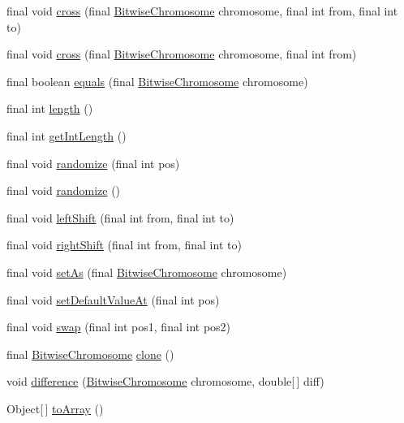 \begin{DoxyCompactItemize}
final void \hyperlink{classjenes_1_1chromosome_1_1_bitwise_chromosome_a2d711baa2a74ccb064d33ef73edbd464}{cross} (final \hyperlink{classjenes_1_1chromosome_1_1_bitwise_chromosome}{Bitwise\-Chromosome} chromosome, final int from, final int to)
\item 
final void \hyperlink{classjenes_1_1chromosome_1_1_bitwise_chromosome_a933b1991999fa3b586c1739744751725}{cross} (final \hyperlink{classjenes_1_1chromosome_1_1_bitwise_chromosome}{Bitwise\-Chromosome} chromosome, final int from)
\item 
final boolean \hyperlink{classjenes_1_1chromosome_1_1_bitwise_chromosome_a41c9858f7ef05194011d1e227fea3584}{equals} (final \hyperlink{classjenes_1_1chromosome_1_1_bitwise_chromosome}{Bitwise\-Chromosome} chromosome)
\item 
final int \hyperlink{classjenes_1_1chromosome_1_1_bitwise_chromosome_a0da8899c89f8b1f222526acf1d2e8519}{length} ()
\item 
final int \hyperlink{classjenes_1_1chromosome_1_1_bitwise_chromosome_a5878e8d0ace81cfb617f75109c02855d}{get\-Int\-Length} ()
\item 
final void \hyperlink{classjenes_1_1chromosome_1_1_bitwise_chromosome_a1a79d4c9c671d2f735d57d64c59dfdb8}{randomize} (final int pos)
\item 
final void \hyperlink{classjenes_1_1chromosome_1_1_bitwise_chromosome_a8028fde93528b7b51313f6c311b2b640}{randomize} ()
\item 
final void \hyperlink{classjenes_1_1chromosome_1_1_bitwise_chromosome_ab02c791be30c931cae793289185e459f}{left\-Shift} (final int from, final int to)
\item 
final void \hyperlink{classjenes_1_1chromosome_1_1_bitwise_chromosome_afb689c4b268f7954214a9d0e13c6141e}{right\-Shift} (final int from, final int to)
\item 
final void \hyperlink{classjenes_1_1chromosome_1_1_bitwise_chromosome_aa4fbad5a25ae14e9524a6ff0ec2536ca}{set\-As} (final \hyperlink{classjenes_1_1chromosome_1_1_bitwise_chromosome}{Bitwise\-Chromosome} chromosome)
\item 
final void \hyperlink{classjenes_1_1chromosome_1_1_bitwise_chromosome_ae5be5fc21ff47526230a8a13ca945c08}{set\-Default\-Value\-At} (final int pos)
\item 
final void \hyperlink{classjenes_1_1chromosome_1_1_bitwise_chromosome_afac4935f0e1d92b6b1aaf9de024e8cbb}{swap} (final int pos1, final int pos2)
\item 
final \hyperlink{classjenes_1_1chromosome_1_1_bitwise_chromosome}{Bitwise\-Chromosome} \hyperlink{classjenes_1_1chromosome_1_1_bitwise_chromosome_a2140b588068c430eaea7e9a7a5fe6b00}{clone} ()
\item 
void \hyperlink{classjenes_1_1chromosome_1_1_bitwise_chromosome_a33de872210289a305bc869c61a02eddb}{difference} (\hyperlink{classjenes_1_1chromosome_1_1_bitwise_chromosome}{Bitwise\-Chromosome} chromosome, double\mbox{[}$\,$\mbox{]} diff)
\item 
Object\mbox{[}$\,$\mbox{]} \hyperlink{classjenes_1_1chromosome_1_1_bitwise_chromosome_aa191192f94ce72a631237674d81ae393}{to\-Array} ()
\end{DoxyCompactItemize}


